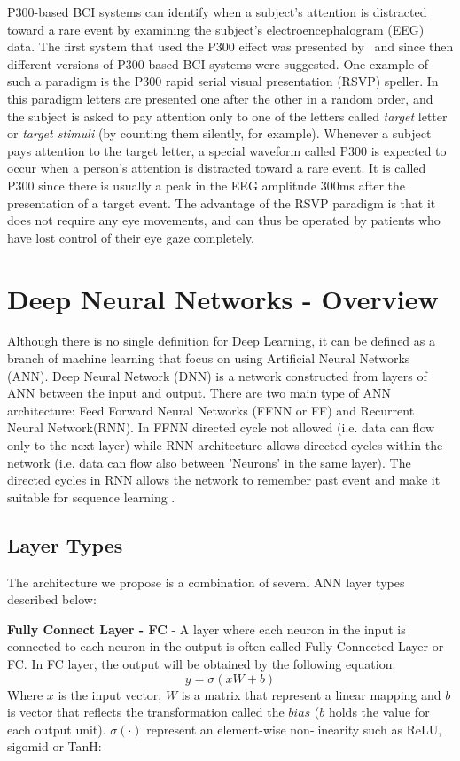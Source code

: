 \documentclass[
12pt, %
english, %
doublespacing, %
headsepline, %
]{MastersDoctoralThesis} %
\begin{document}
P300-based BCI systems can identify when a subject's attention is distracted toward a rare event by examining the subject's electroencephalogram (EEG) data. The first system that used the P300 effect was presented by~\cite{FirstP300} and since then different versions of P300 based BCI systems were suggested. One example of such a paradigm is the P300 rapid serial visual presentation (RSVP) speller. In this paradigm letters are presented one after the other in a random order, and the subject is asked to pay attention only to one of the letters called \textit{target} letter or \textit{target stimuli} (by counting them silently, for example). Whenever a subject pays attention to the target letter, a special waveform called P300 is expected to occur when a person's attention is distracted toward a rare event. It is called P300 since there is usually a peak in the EEG amplitude 300ms after the presentation of a target event. The advantage of the RSVP paradigm is that it does not require any eye movements, and can thus be operated by patients who have lost control of their eye gaze completely.

\section{Deep Neural Networks - Overview}

Although there is no single definition for Deep Learning, it can be defined as a branch of machine learning that focus on using Artificial Neural Networks (ANN). Deep Neural Network (DNN) is a network constructed from layers of ANN between the input and output. There are two main type of ANN architecture: Feed Forward Neural Networks (FFNN or FF) and Recurrent Neural Network(RNN). In FFNN directed cycle not allowed (i.e. data can flow only to the next layer)  while RNN architecture allows directed cycles within the network (i.e. data can flow also between 'Neurons' in the same layer). The directed cycles in RNN allows the network to remember past event and make it suitable for sequence learning \cite{rumelhart1985learning}.

\subsection{Layer Types}
The architecture we propose is a combination of several ANN layer types described below:

\textbf{Fully Connect Layer - FC} - A layer where each neuron in the input is connected to each neuron in the output is often called Fully Connected Layer or FC. In FC layer, the output will be obtained by the following equation:
\[y=\sigma \left( {xW + b} \right)\]
Where $x$ is the input vector, $W$ is a matrix that represent a linear mapping and $b$ is vector that reflects the transformation called the $bias$ ($b$ holds the value for each output unit). $\sigma \left( \cdot \right)$ represent an element-wise non-linearity such as ReLU, sigomid or TanH:
\end{document}

